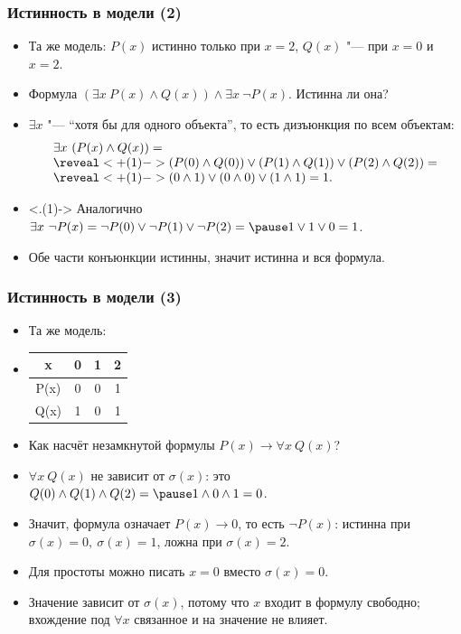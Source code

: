 \documentclass[10pt]{beamer}
\begin{document}
\begin{frame}
    \frametitle{Истинность в модели (2)}
    \begin{itemize}
        \item Та же модель: $P(x)$ истинно только при $x = 2$, $Q(x)$ "--- при $x = 0$ и $x = 2$.
        \item Формула $(\exists x ~ P(x) \land Q(x)) \land \exists x ~ \neg P(x)$. Истинна ли она? \pause
        \item $\exists x$ "--- \enquote{хотя бы для одного объекта}, то есть дизъюнкция по всем объектам:
        \[ \begin{array}{l}
            \exists x ~ (P(x) \land Q(x)) = \\
            \reveal<+(1)->{(P(0) \land Q(0)) \lor (P(1) \land Q(1)) \lor (P(2) \land Q(2)) =} \\
            \reveal<+(1)->{(0 \land 1) \lor (0 \land 0) \lor (1 \land 1) = 1.}
        \end{array} \]
        \item<.(1)-> Аналогично $\exists x ~ \neg P(x) = \neg P(0) \lor \neg P(1) \lor \neg P(2) = \pause 1 \lor 1 \lor 0 = 1$. \pause
        \item Обе части конъюнкции истинны, значит истинна и вся формула.
    \end{itemize}
\end{frame}

\begin{frame}
    \frametitle{Истинность в модели (3)}
    \begin{itemize}
        \item Та же модель:
        \item[] \begin{tabular}{c | c c c}
            x & 0 & 1 & 2 \\ \hline
            P(x) & 0 & 0 & 1 \\
            Q(x) & 1 & 0 & 1
        \end{tabular}
        \item Как насчёт незамкнутой формулы $P(x) \to \forall x ~ Q(x)$? \pause
        \item $\forall x ~ Q(x)$ не зависит от $\sigma(x)$: это $Q(0) \land Q(1) \land Q(2) = \pause 1 \land 0 \land 1 = 0$.
        \item Значит, формула означает $P(x) \to 0$, то есть $\neg P(x)$: \pause истинна при $\sigma(x) = 0,~\sigma(x) = 1$, ложна при $\sigma(x) = 2$.
        \item Для простоты можно писать $x = 0$ вместо $\sigma(x) = 0$. \pause
        \item Значение зависит от $\sigma(x)$, потому что $x$ входит в формулу свободно; вхождение под $\forall x$ связанное и на значение не влияет.
    \end{itemize}
\end{frame}
\end{document}
